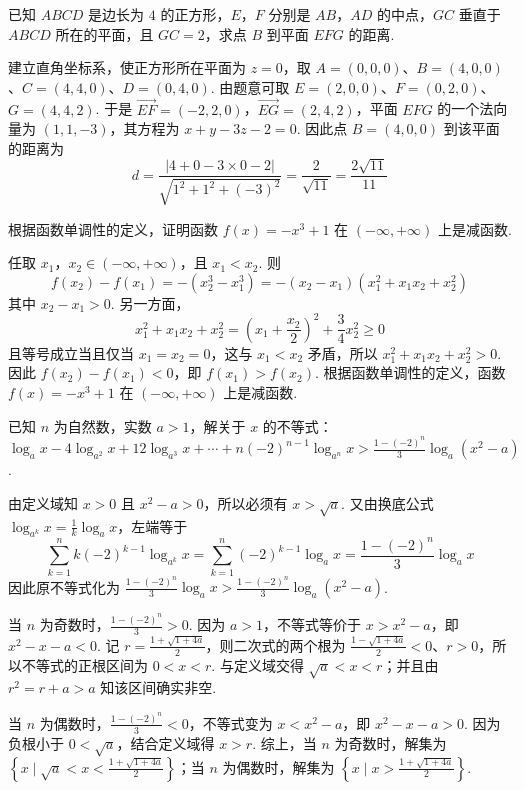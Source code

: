 \begin{problem}
已知 \(ABCD\) 是边长为 \(4\) 的正方形，\(E\)，\(F\) 分别是 \(AB\)，\(AD\) 的中点，\(GC\) 垂直于 \(ABCD\) 所在的平面，且 \(GC=2\)，求点 \(B\) 到平面 \(EFG\) 的距离.

\begin{solution}
建立直角坐标系，使正方形所在平面为 \(z=0\)，取 \(A=(0,0,0)\)、\(B=(4,0,0)\)、\(C=(4,4,0)\)、\(D=(0,4,0)\). 由题意可取 \(E=(2,0,0)\)、\(F=(0,2,0)\)、\(G=(4,4,2)\). 于是 \(\overrightarrow{EF}=(-2,2,0)\)，\(\overrightarrow{EG}=(2,4,2)\)，平面 \(EFG\) 的一个法向量为 \((1,1,-3)\)，其方程为 \(x+y-3z-2=0\). 因此点 \(B=(4,0,0)\) 到该平面的距离为
\[
d=\frac{\lvert4+0-3\times0-2\rvert}{\sqrt{1^2+1^2+(-3)^2}}=\frac{2}{\sqrt{11}}=\frac{2\sqrt{11}}{11}
\]
\end{solution}
\end{problem}

\begin{problem}
根据函数单调性的定义，证明函数 \(f(x)=-x^3+1\) 在 \(\left(-\infty,+\infty\right)\) 上是减函数.

\begin{solution}
任取 \(x_1\)，\(x_2\in\left(-\infty,+\infty\right)\)，且 \(x_1<x_2\). 则
\[
f(x_2)-f(x_1)=-(x_2^3-x_1^3)=-(x_2-x_1)(x_1^2+x_1x_2+x_2^2)
\]
其中 \(x_2-x_1>0\). 另一方面，
\[
x_1^2+x_1x_2+x_2^2=\left(x_1+\frac{x_2}{2}\right)^2+\frac34x_2^2\geqslant0
\]
且等号成立当且仅当 \(x_1=x_2=0\)，这与 \(x_1<x_2\) 矛盾，所以 \(x_1^2+x_1x_2+x_2^2>0\). 因此 \(f(x_2)-f(x_1)<0\)，即 \(f(x_1)>f(x_2)\). 根据函数单调性的定义，函数 \(f(x)=-x^3+1\) 在 \(\left(-\infty,+\infty\right)\) 上是减函数.
\end{solution}
\end{problem}

\begin{problem}
已知 \(n\) 为自然数，实数 \(a>1\)，解关于 \(x\) 的不等式：\(\log_a x-4\log_{a^2} x+12\log_{a^3} x+\cdots+n(-2)^{n-1}\log_{a^n} x>\frac{1-(-2)^n}{3}\log_a\left(x^2-a\right)\).

\begin{solution}
由定义域知 \(x>0\) 且 \(x^2-a>0\)，所以必须有 \(x>\sqrt a\). 又由换底公式 \(\log_{a^k}x=\frac1k\log_a x\)，左端等于
\[
\sum_{k=1}^{n}k(-2)^{k-1}\log_{a^k}x=\sum_{k=1}^{n}(-2)^{k-1}\log_a x=\frac{1-(-2)^n}{3}\log_a x
\]
因此原不等式化为 \(\frac{1-(-2)^n}{3}\log_a x>\frac{1-(-2)^n}{3}\log_a\left(x^2-a\right)\).

当 \(n\) 为奇数时，\(\frac{1-(-2)^n}{3}>0\). 因为 \(a>1\)，不等式等价于 \(x>x^2-a\)，即 \(x^2-x-a<0\). 记 \(r=\frac{1+\sqrt{1+4a}}{2}\)，则二次式的两个根为 \(\frac{1-\sqrt{1+4a}}{2}<0\)、\(r>0\)，所以不等式的正根区间为 \(0<x<r\). 与定义域交得 \(\sqrt a<x<r\)；并且由 \(r^2=r+a>a\) 知该区间确实非空.

当 \(n\) 为偶数时，\(\frac{1-(-2)^n}{3}<0\)，不等式变为 \(x<x^2-a\)，即 \(x^2-x-a>0\). 因为负根小于 \(0<\sqrt a\)，结合定义域得 \(x>r\). 综上，当 \(n\) 为奇数时，解集为 \(\left\{x\mid\sqrt a<x<\frac{1+\sqrt{1+4a}}{2}\right\}\)；当 \(n\) 为偶数时，解集为 \(\left\{x\mid x>\frac{1+\sqrt{1+4a}}{2}\right\}\).
\end{solution}
\end{problem}

